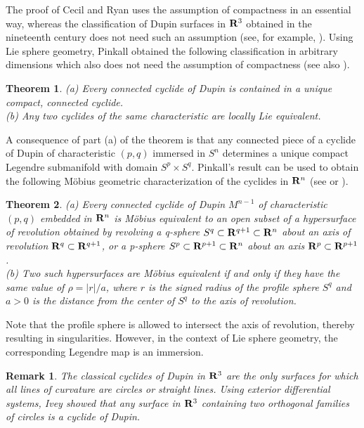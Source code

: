 \documentclass[12pt]{article}
\newtheorem{theorem}{Theorem}[section]
\newtheorem{remark}{Remark}[section]
\begin{document}
{The proof of Cecil and Ryan \cite{CRMA}
uses the assumption of compactness in an essential way, whereas the classification of Dupin surfaces
in ${\bf R}^3$ obtained in the nineteenth century does
not need such an assumption (see, for example, \cite[pp. 151-166]{CR7}).  
Using Lie sphere geometry,
Pinkall \cite{P2} obtained the following classification in arbitrary 
dimensions which also does
not need the assumption of compactness (see also \cite[pp. 148--159]{Cec9}).
\begin{theorem}
\label{thm:pinkall-cyclides}
{\em (a)} Every connected cyclide of Dupin is contained in a
unique compact, connected cyclide.\\
{\em (b)} Any two cyclides of the same characteristic are locally
Lie equivalent.
\end{theorem}
A consequence of part (a) of the theorem is that
any connected
piece of a cyclide of Dupin of characteristic $(p,q)$ immersed
in $S^n$ determines a unique compact Legendre submanifold 
with domain $S^p \times S^q$.
Pinkall's result can be used to obtain the following M\"{o}bius
geometric characterization of the cyclides in ${\bf R}^n$ 
(see \cite{CecL} or \cite[p .151]{Cec9}).

\begin{theorem}
\label{thm:cyclides-moebius}
{\em (a)} Every connected cyclide of Dupin $M^{n-1}$ of characteristic
$(p,q)$ embedded in ${\bf R}^n$ is M\"{o}bius equivalent to an open
subset of a hypersurface of revolution obtained by revolving a
q-sphere $S^q \subset {\bf R}^{q+1} \subset {\bf R}^n$ about an axis
of revolution ${\bf R}^q \subset {\bf R}^{q+1}$, or a p-sphere $S^p
\subset {\bf R}^{p+1} \subset {\bf R}^n$ about an axis
${\bf R}^p \subset {\bf R}^{p+1}$.\\
{\em (b)} Two such hypersurfaces are M\"{o}bius equivalent if and only if
they have the same value of $\rho = |r|/a$, where $r$ is the signed
radius of the profile sphere $S^q$ and $a>0$ is the distance from
the center
of $S^q$ to the axis of revolution.
\end{theorem}
Note that the profile sphere is allowed to intersect the axis
of revolution, thereby resulting in singularities.  However,
in the context of Lie sphere geometry, the corresponding Legendre
map is an immersion.

\begin{remark} 
\label{rem:cyclides-ivey}
{\rm The classical cyclides of Dupin in ${\bf R}^3$ are the only surfaces
for which all lines of curvature are circles or straight lines.
Using exterior differential systems,
Ivey \cite{Ivey} showed that any surface in ${\bf R}^3$ containing
two orthogonal families of circles  is a cyclide of Dupin.}
\end{remark}

}
\end{document}
